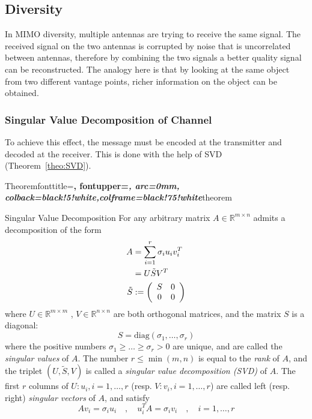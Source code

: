 \subsection{Diversity}
\label{subsection:MIMO-Diversity}
In MIMO diversity, multiple antennas are trying to receive the same signal. The received signal on the two antennas is corrupted by noise that is uncorrelated between antennas, therefore by combining the two signals a better quality signal can be reconstructed. The analogy here is that by looking at the same object from two different vantage points, richer information on the object can be obtained.

\subsubsection{Singular Value Decomposition of Channel}
To achieve this effect, the message must be encoded at the transmitter and decoded at the receiver. This is done with the help of SVD (Theorem~\ref{theo:SVD}).

  {Theorem}{fonttitle=\bfseries\upshape, fontupper=\slshape,
     arc=0mm, colback=black!5!white,colframe=black!75!white}{theorem}

\begin{SVD_theo}{Singular Value Decomposition}{}
    For any arbitrary matrix $A \in \mathbb{R}^{m \times n}$ admits a decomposition of the form
    \begin{equation}
        \label{theo:SVD}
        \begin{aligned}
            A &= \sum_{i=1}^{r} \sigma_i u_i v^T_i \\
            &= U \tilde{S} V^T \\
            \tilde{S} &:= \left( \begin{array}{c c}
                S & 0 \\
                0 & 0
            \end{array} \right)
        \end{aligned}
    \end{equation}
    where $U \in \mathbb{R}^{m \times m}$ , $V \in \mathbb{R}^{n \times n}$ are both orthogonal matrices, and the matrix $S$ is a diagonal:
    \[ S = \text{diag}\left( \sigma_1 , \ldots , \sigma_r \right) \]
    where the positive numbers $\sigma_1 \ge \ldots \ge \sigma_r >0$ are unique, and are called the \emph{singular values} of $A$.
    The number $r \leq \min(m,n)$ is equal to the \emph{rank} of $A$, and the triplet $(U,\tilde{{S}},V)$ is called a \emph{singular value decomposition (SVD)} of $A$.
    The first $r$ columns of $U: u_i, i=1,\ldots,r$ (resp. $V: v_i, i=1,\ldots,r$) are called left (resp. right) \emph{singular vectors} of $A$, and satisfy
    \[ Av_i = \sigma_i u_i \quad , \quad u_i^T A = \sigma_i v_i \quad , \quad i = 1,\ldots,r \]

\end{SVD_theo}

